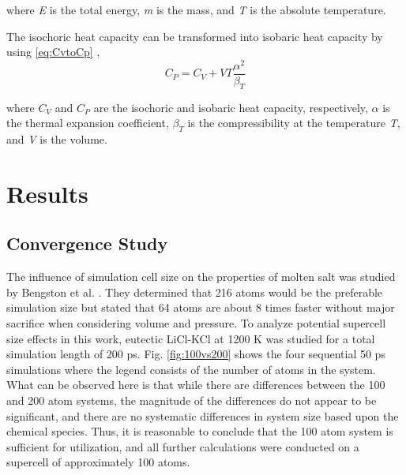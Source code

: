\documentclass[review]{elsarticle}
\begin{document}
\noindent where \textit{E} is the total energy, \textit{m} is the mass, and \textit{T} is the absolute temperature.

The isochoric heat capacity can be transformed into isobaric heat capacity by using \cref{eq:CvtoCp} \cite{Gaskell},
\begin{equation}
  \label{eq:CvtoCp}
     C_P = C_V + VT\frac{\alpha^2}{\beta_T}
\end{equation}

\noindent where \textit{$C_V$} and \textit{$C_P$} are the isochoric and isobaric heat capacity, respectively, \textit{$\alpha$} is the thermal expansion coefficient, \textit{$\beta_T$} is the compressibility at the temperature \textit{T}, and \textit{V} is the volume.
\FloatBarrier


\section{Results}

\subsection{Convergence Study}
The influence of simulation cell size on the properties of molten salt was studied by Bengston et al. \cite{Bengston2014}. They determined that 216 atoms would be the preferable simulation size but stated that 64 atoms are about 8 times faster without major sacrifice when considering volume and pressure. To analyze potential supercell size effects in this work, eutectic LiCl-KCl at 1200 K was studied for a total simulation length of 200 ps. Fig. \ref{fig:100vs200} shows the four sequential 50 ps simulations where the legend consists of the number of atoms in the system. What can be observed here is that while there are differences between the 100 and 200 atom systems, the magnitude of the differences do not appear to be significant, and there are no systematic differences in system size based upon the chemical species. Thus, it is reasonable to conclude that the 100 atom system is sufficient for utilization, and all further calculations were conducted on a supercell of approximately 100 atoms. 
 
\end{document}
